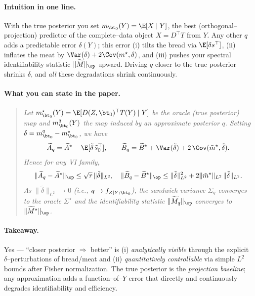 \paragraph{Intuition in one line.}
With the true posterior you set \(m_{\bt_0}(Y)=\E[X\mid Y]\), the best (orthogonal–projection) predictor of the complete–data object \(X=D^\top T\) from $Y$. Any other $q$ adds a predictable error $\delta(Y)$; this error (i) tilts the bread via $\E[\delta s^\top]$, (ii) inflates the meat by \(\Var(\delta)+2\Cov(m^\star,\delta)\), and (iii) pushes your spectral identifiability statistic $\|\widetilde M\|_{\op}$ upward. Driving $q$ closer to the true posterior shrinks $\delta$, and \emph{all} these degradations shrink continuously.

\paragraph{What you can state in the paper.}
\begin{quote}
\emph{Let $m^\star_{\bt_0}(Y)=\E[D(Z,\bt_0)^\top T(Y)\mid Y]$ be the oracle (true posterior) map
and $m^q_{\bt_0}(Y)$ the map induced by an approximate posterior $q$. Setting $\delta=m^q_{\bt_0}-m^\star_{\bt_0}$, we have}
\[
\widetilde A_q=\widetilde A^\star-\E[\tilde\delta\,\tilde s_0^\top],\qquad
\widetilde B_q=\widetilde B^\star + \Var(\tilde\delta)+2\,\Cov(\tilde m^\star,\tilde\delta).
\]
\emph{Hence for any VI family,}
\[
\|\widetilde A_q-\widetilde A^\star\|_{\op}\le \sqrt{r}\,\|\tilde\delta\|_{L^2},
\quad
\|\widetilde B_q-\widetilde B^\star\|_{\op}\le \|\tilde\delta\|_{L^2}^2 + 2\|\tilde m^\star\|_{L^2}\,\|\tilde\delta\|_{L^2}.
\]
\emph{As $\|\tilde\delta\|_{L^2}\to0$ (i.e., $q\to f_{Z\mid Y;\bt_0}$), the sandwich variance $\Sigma_q$ converges to the oracle $\Sigma^\star$ and the identifiability statistic $\|\widetilde M_q\|_{\op}$ converges to $\|\widetilde M^\star\|_{\op}$.}
\end{quote}

\paragraph{Takeaway.}
Yes — “closer posterior $\Rightarrow$ better” is (i) \emph{analytically visible} through the explicit $\delta$–perturbations of bread/meat and (ii) \emph{quantitatively controllable} via simple $L^2$ bounds after Fisher normalization. The true posterior is the \emph{projection baseline}; any approximation adds a function–of–$Y$ error that directly and continuously degrades identifiability and efficiency.
